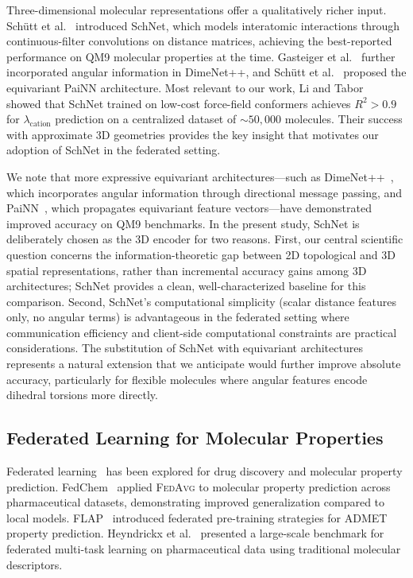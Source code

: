 \documentclass[twocolumn]{article}
\newcommand{\lamcat}{\lambda_{\text{cation}}}
\newcommand{\Rsq}{R^{2}}
\newcommand{\FedAvg}{\textsc{FedAvg}}
\begin{document}
Three-dimensional molecular representations offer a qualitatively richer input.
Sch\"utt et al.~\cite{Schutt2018_SchNet} introduced SchNet, which models interatomic interactions through continuous-filter convolutions on distance matrices, achieving the best-reported performance on QM9 molecular properties at the time.
Gasteiger et al.~\cite{Gasteiger2020_DimeNet} further incorporated angular information in DimeNet++, and Sch\"utt et al.~\cite{Schutt2021_PaiNN} proposed the equivariant PaiNN architecture.
Most relevant to our work, Li and Tabor~\cite{Li2023_SchNet} showed that SchNet trained on low-cost force-field conformers achieves $\Rsq > 0.9$ for $\lamcat$ prediction on a centralized dataset of ${\sim}50{,}000$ molecules.
Their success with approximate 3D geometries provides the key insight that motivates our adoption of SchNet in the federated setting.

We note that more expressive equivariant architectures---such as DimeNet++~\cite{Gasteiger2020_DimeNet}, which incorporates angular information through directional message passing, and PaiNN~\cite{Schutt2021_PaiNN}, which propagates equivariant feature vectors---have demonstrated improved accuracy on QM9 benchmarks.
In the present study, SchNet is deliberately chosen as the 3D encoder for two reasons.
First, our central scientific question concerns the information-theoretic gap between 2D topological and 3D spatial representations, rather than incremental accuracy gains among 3D architectures; SchNet provides a clean, well-characterized baseline for this comparison.
Second, SchNet's computational simplicity (scalar distance features only, no angular terms) is advantageous in the federated setting where communication efficiency and client-side computational constraints are practical considerations.
The substitution of SchNet with equivariant architectures represents a natural extension that we anticipate would further improve absolute accuracy, particularly for flexible molecules where angular features encode dihedral torsions more directly.

\subsection{Federated Learning for Molecular Properties}

Federated learning~\cite{McMahan2017_FedAvg} has been explored for drug discovery and molecular property prediction.
FedChem~\cite{FedChem2022} applied \FedAvg{} to molecular property prediction across pharmaceutical datasets, demonstrating improved generalization compared to local models.
FLAP~\cite{FLAP2023} introduced federated pre-training strategies for ADMET property prediction.
Heyndrickx et al.~\cite{Heyndrickx2023} presented a large-scale benchmark for federated multi-task learning on pharmaceutical data using traditional molecular descriptors.
\end{document}
